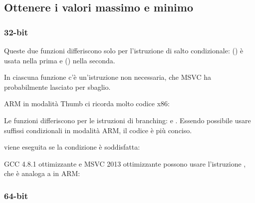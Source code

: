 \subsection{Ottenere i valori massimo e minimo}

\subsubsection{32-bit}






Queste due funzioni differiscono solo per l'istruzione di salto condizionale: 
 () è usata nella prima
e  () nella seconda.

\myindex{\CompilerAnomaly}
\label{MSVC_double_JMP_anomaly}

In ciascuna funzione c'è un'istruzione \JMP non necessaria, che MSVC ha probabilmente lasciato per sbaglio.


ARM in modalità Thumb ci ricorda molto codice x86:




Le funzioni differiscono per le istruzioni di branching:  e .
Essendo possibile usare suffissi condizionali in modalità ARM, il codice è più conciso.

 viene eseguita se la condizione è soddisfatta:



\Optimizing GCC 4.8.1 ottimizzante e MSVC 2013 ottimizzante possono usare l'istruzione , che è analoga a  in ARM:



\subsubsection{64-bit}

